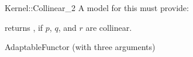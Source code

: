 \begin{ccRefFunctionObjectConcept}{Kernel::Collinear_2}
A model for this must provide:


{returns , if $p$, $q$, and $r$ are collinear.}

\ccRefines
AdaptableFunctor (with three arguments)

\ccSeeAlso
{} \\

\end{ccRefFunctionObjectConcept}
